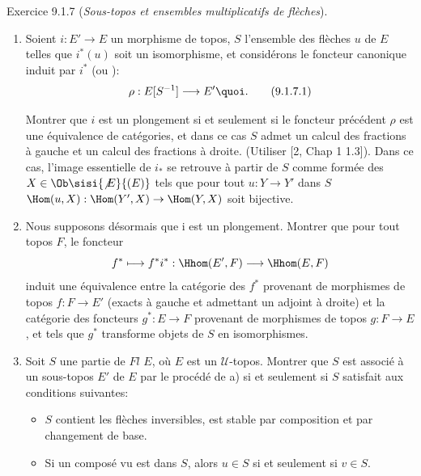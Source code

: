 \documentclass[10pt]{../fichiers-configuration-latex/smfart}
\begin{document}
\begin{enonce*}[remark]{Exercice 9.1.7}
(\emph{Sous-topos et ensembles multiplicatifs de flèches}).

\begin{enumerate}
\renewcommand{\theenumi}{\alph{enumi}}
\renewcommand{\labelenumi}{\theenumi)}
\item Soient $i:E'\rightarrow E$ un morphisme de topos, $S$ l'ensemble des
flèches $u$ de $E$ telles que $i^{\ast}(u)$ soit un isomorphisme, et
considérons le foncteur canonique induit par $i^{\ast}$ (\cf [2,
Chap I] ou ):
\begin{equation*}
\rho:E[S^{-1}]\longrightarrow E'{\quoi}.\tag{9.1.7.1}
\end{equation*}

Montrer que $i$ est un plongement si et seulement si le foncteur
précédent $\rho$ est une équivalence de catégories, et dans ce cas
$S$ admet un calcul des fractions à gauche et un calcul des
fractions à droite. (Utiliser [2, Chap 1 1.3]). Dans ce cas, l'image
essentielle de $i_{\ast}$ se retrouve à partir de $S$ comme formée
des $X\in \Ob \sisi{\not{E}}{(E)}$ tels que pour tout\pageoriginale
$u:Y\rightarrow Y'$ dans $S$ $\Hom(u,X):\Hom(Y',X)\rightarrow
\Hom(Y,X)$ soit bijective.

\item Nous supposons désormais que i est un plongement. Montrer que
pour tout topos $F$, le foncteur
$$
f^{\ast}\longmapsto f^{\ast}i^{\ast}:\Hhom(E',F)\longrightarrow
\Hhom(E,F)
$$
induit une équivalence entre la catégorie des $f^{\ast}$ provenant
de morphismes de topos $f:F\rightarrow E'$ (\ie exacts à gauche et
admettant un adjoint à droite) et la catégorie des foncteurs
$g^{\ast}:E\rightarrow F$ provenant de morphismes de topos
$g:F\rightarrow E$, et tels que $g^{\ast}$ transforme objets de $S$
en isomorphismes.

\item Soit $S$ une partie de $Fl$ $E$, où $E$ est un
$𝒰$-topos. Montrer que $S$ est associé à un sous-topos $E'$
de $E$ par le procédé de a) si et seulement si $S$ satisfait aux
conditions suivantes:
\begin{itemize}
\item[ST 1)] $S$ contient les flèches inversibles, est stable par
composition et par changement de base.

\item[ST 2)] Si un composé vu est dans $S$, alors $u\in S$ si et
seulement si $v\in S$.


\end{itemize}
\end{enumerate}
\end{enonce*}
\end{document}
